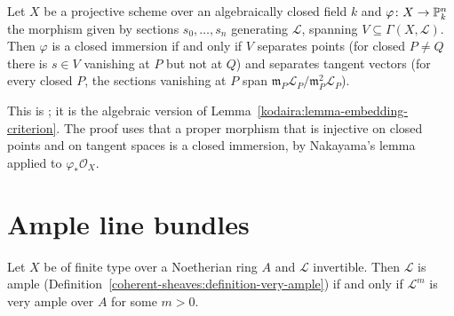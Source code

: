\begin{proposition}\label{divisors:proposition-closed-immersion-criterion}
Let $X$ be a projective scheme over an algebraically closed field $k$ and $\varphi \colon X \to \mathbb{P}^n_k$ the morphism given by sections $s_0, \ldots, s_n$ generating
$\mathcal{L}$, spanning $V \subseteq \Gamma(X, \mathcal{L})$. Then $\varphi$ is a closed immersion if and only if $V$ separates points (for closed $P \neq Q$ there is $s \in V$
vanishing at $P$ but not at $Q$) and separates tangent vectors (for every closed $P$, the sections vanishing at $P$ span $\mathfrak{m}_P\mathcal{L}_P/\mathfrak{m}_P^2\mathcal{L}_P$).
\end{proposition}

This is \cite[Proposition II.7.3]{hartshorne-ag}; it is the algebraic version of Lemma~\ref{kodaira:lemma-embedding-criterion}. The proof uses that a proper
morphism that is injective on closed points and on tangent spaces is a closed immersion, by Nakayama's lemma applied to $\varphi_*\mathcal{O}_X$.

\section{Ample line bundles}\label{divisors:section-ample}

\begin{theorem}\label{divisors:theorem-ample-very-ample}
Let $X$ be of finite type over a Noetherian ring $A$ and $\mathcal{L}$ invertible. Then $\mathcal{L}$ is ample (Definition~\ref{coherent-sheaves:definition-very-ample}) if and only
if $\mathcal{L}^m$ is very ample over $A$ for some $m > 0$.
\end{theorem}

